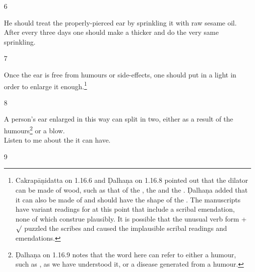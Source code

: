 \begin{translation}
\item[6] 
    
He should treat the properly-pierced ear by sprinkling it with raw sesame
oil.   After every three days one should make a thicker  and
do the very same sprinkling.
    
\item[7] 
    
Once the ear is free from humours or side-effects, one should put in a light
 in order to enlarge it enough.\footnote{Cakrapāṇidatta
    on 1.16.6 \citep[127]{acar-1939} and Ḍalhaṇa on 1.16.8 \citep[77]{vulgate} pointed
    out that the dilator can be made of wood, such as that of the
    , the  and the
    . Ḍalhaṇa added that it can also be made of
     and should have the shape of the . The manuscripts have variant readings for  at this point that include a scribal
    emendation, none of which construe plausibly. It is possible that the unusual
    verb form +$\surd$ puzzled the scribes and caused 
    the implausible scribal readings and emendations.} 
    
\item[8]
    
\begin{sloka}
A person's ear enlarged in this way can split in two, either as a result of the 
humours\footnote{Ḍalhaṇa on 1.16.9  \citep[77]{vulgate} notes that the word  
here can refer to either a humour, such as , as we have understood it, or a 
disease generated from a humour.} or a blow.\\ Listen to me about the 
it can have. 
    \end{sloka}
    
\item[9]
    

\end{translation}
